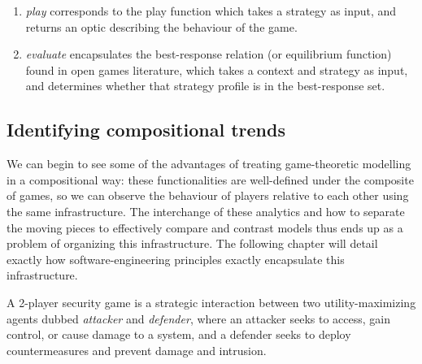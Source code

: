 \begin{enumerate}
	\item \textit{play} corresponds to the play function which takes a strategy as input, and returns an optic describing the behaviour of the game. 
	\item \textit{evaluate} encapsulates the best-response relation (or equilibrium function) found in open games literature, which takes a context and strategy as input, and determines whether that strategy profile is in the best-response set. 
\end{enumerate}





\subsection{Identifying compositional trends}
We can begin to see some of the advantages of treating game-theoretic modelling in a compositional way: these functionalities are well-defined under the composite of games, so we can observe the behaviour of players relative to each other using the same infrastructure. The interchange of these analytics and how to separate the moving pieces to effectively compare and contrast models thus ends up as a problem of organizing this infrastructure. The following chapter will detail exactly how software-engineering principles exactly encapsulate this infrastructure. 




\begin{Definition}
	A 2-player security game is a strategic interaction between two utility-maximizing agents dubbed \textit{attacker} and \textit{defender}, where an attacker seeks to access, gain control, or cause damage to a system, and a defender seeks to deploy countermeasures and prevent damage and intrusion.
\end{Definition}

